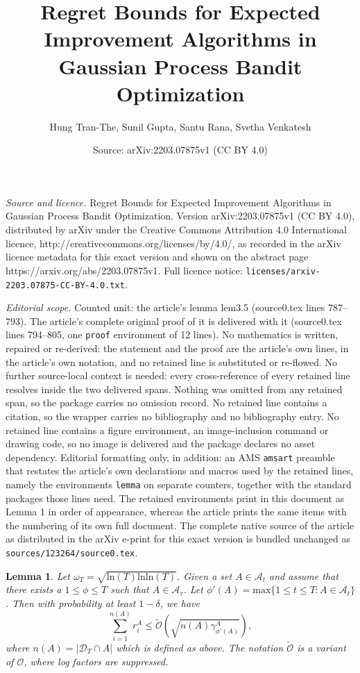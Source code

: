 \documentclass[10pt,a4paper]{amsart}
\title{Regret Bounds for Expected Improvement Algorithms in Gaussian Process Bandit Optimization}
\author{Hung Tran-The, Sunil Gupta, Santu Rana, Svetha Venkatesh}
\date{Source: arXiv:2203.07875v1 (CC BY 4.0)}
\newtheorem{lemma}{Lemma}
\begin{document}
\maketitle

\noindent\emph{Source and licence.} Regret Bounds for Expected Improvement Algorithms in Gaussian Process Bandit Optimization. Version arXiv:2203.07875v1 (CC BY 4.0), distributed by arXiv under the Creative Commons Attribution 4.0 International licence, http://creativecommons.org/licenses/by/4.0/, as recorded in the arXiv licence metadata for this exact version and shown on the abstract page https://arxiv.org/abs/2203.07875v1. Full licence notice: \texttt{licenses/arxiv-2203.07875-CC-BY-4.0.txt}.\par\smallskip

\noindent\textit{Editorial scope.} Counted unit: the article's lemma lem3.5 (source0.tex lines 787--793). The article's complete original proof of it is delivered with it (source0.tex lines 794--805, one \texttt{proof} environment of 12 lines). No mathematics is written, repaired or re-derived: the statement and the proof are the article's own lines, in the article's own notation, and no retained line is substituted or re-flowed.  No further source-local context is needed: every cross-reference of every retained line resolves inside the two delivered spans.  Nothing was omitted from any retained span, so the package carries no omission record.  No retained line contains a citation, so the wrapper carries no bibliography and no bibliography entry.  No retained line contains a figure environment, an image-inclusion command or drawing code, so no image is delivered and the package declares no asset dependency.  Editorial formatting only, in addition: an AMS \texttt{amsart} preamble that restates the article's own declarations and macros used by the retained lines, namely the environments \texttt{lemma} on separate counters, together with the standard packages those lines need.  The retained environments print in this document as Lemma 1 in order of appearance, whereas the article prints the same items with the numbering of its own full document.  The complete native source of the article as distributed in the arXiv e-print for this exact version is bundled unchanged as \texttt{sources/123264/source0.tex}.
\begin{lemma}
Let $\omega_T = \sqrt{\text{ln}(T)\text{ln} \text{ln}(T)}$. Given a set $A \in \mathcal A_t$ and assume that there exists a $1 \le \phi \le T$ such that $A \in \mathcal A_{\tau}$. Let $\phi'(A) = \text{max}\{1 \le t \le T: A \in \mathcal A_t\}$. Then with probability at least $1 - \delta$, we have
$$\sum_{i=1}^{n(A)}r^A_i \le \tilde{\mathcal O}(\sqrt{n(A)\gamma^A_{\phi'(A)}}),$$
where $n(A) = |\mathcal D_T \cap A|$ which is defined as above. The notation $\tilde{\mathcal O}$ is a
variant of $\mathcal O$, where log factors are suppressed.
\label{lem3.5}
\end{lemma}
\end{document}
